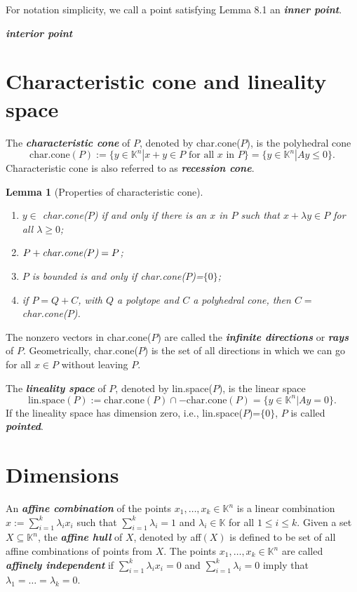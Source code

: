 \documentclass{article}
\newtheorem{lemma}[theorem]{Lemma}
\def\K{{\mathbb K}}
\begin{document}
For notation simplicity, we call a point satisfying Lemma 8.1 an \emph{\textbf{inner point}}.

\emph{\textbf{interior point}}



\section{Characteristic cone and lineality space}
The \emph{\textbf{characteristic cone}} of $P$, denoted by char.cone($P$), is the polyhedral cone
$$\mbox{char.cone}(P):=\{y\in \K^n|x+y\in P\mbox{~for all~}x \mbox{~in~} P\}=\{y\in\K^n|Ay\leq 0\}.$$
Characteristic cone is also referred to as \emph{\textbf{recession cone}}.

\begin{lemma}[Properties of characteristic cone] \hfill
  \begin{enumerate}
    \item[\emph{(i)}] $y\in$ \emph{char.cone($P$)} if and only if there is an $x$ in $P$ such that $x+\lambda y\in P$ for all $\lambda\geq 0$;
    \item[\emph{(ii)}] $P+\mbox{\emph{char.cone($P$)}}=P$;
    \item[\emph{(iii)}] $P$ is bounded is and only if \emph{char.cone($P$)}=$\{0\}$;
    \item[\emph{(iv)}] if $P=Q+C$, with $Q$  a polytope and $C$ a polyhedral cone, then $C=$\emph{char.cone($P$)}.
  \end{enumerate}
\end{lemma}
The nonzero vectors in char.cone($P$) are called the \emph{\textbf{infinite directions}} or \emph{\textbf{rays}} of $P$. Geometrically, char.cone($P$) is the set of all directions in which we can go for all $x\in P$ without leaving $P$.

The \emph{\textbf{lineality space}} of $P$, denoted by lin.space($P$), is the linear space
$$\mbox{lin.space}(P):=\mbox{char.cone}(P)\cap -\mbox{char.cone}(P)=\{y\in\K^n|Ay=0\}.$$
If the lineality space has dimension zero, i.e., lin.space($P$)=$\{0\}$, $P$ is called \emph{\textbf{pointed}}.

\section{Dimensions}
An \emph{\textbf{affine combination}} of the points $x_1,\dots,x_k\in\K^n$ is a linear combination $x:=\sum_{i=1}^{k}\lambda_i x_i$ such that $\sum_{i=1}^{k}\lambda_i=1$ and $\lambda_i\in\K$ for all $1\leq i\leq k$. Given a set $X\subseteq \K^n$, the \emph{\textbf{affine hull}} of $X$, denoted by aff$(X)$ is defined to be set of all affine combinations of points from $X$. The points $x_1,\dots,x_k\in \K^n$ are called \emph{\textbf{affinely independent}} if $\sum_{i=1}^{k}\lambda_i x_i=0$ and $\sum_{i=1}^{k}\lambda_i=0$ imply that $\lambda_1=\dots=\lambda_k=0$.
\end{document}
